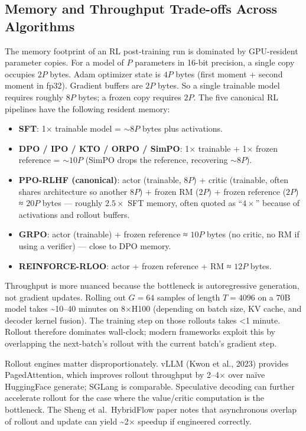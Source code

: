 \documentclass{article}
\begin{document}
\subsection{Memory and Throughput Trade-offs Across Algorithms}\label{memory-and-throughput-trade-offs-across-algorithms}

The memory footprint of an RL post-training run is dominated by GPU-resident parameter copies. For a model of \(P\) parameters in 16-bit precision, a single copy occupies \(2P\) bytes. Adam optimizer state is \(4P\) bytes (first moment + second moment in fp32). Gradient buffers are \(2P\) bytes. So a single trainable model requires roughly \(8P\) bytes; a frozen copy requires \(2P\). The five canonical RL pipelines have the following resident memory:

\begin{itemize}

\item
  \textbf{SFT}: 1× trainable model = \(\sim 8P\) bytes plus activations.
\item
  \textbf{DPO / IPO / KTO / ORPO / SimPO}: 1× trainable + 1× frozen reference = \(\sim 10P\) (SimPO drops the reference, recovering \(\sim 8P\)).
\item
  \textbf{PPO-RLHF (canonical)}: actor (trainable, \(8P\)) + critic (trainable, often shares architecture so another \(8P\)) + frozen RM (\(2P\)) + frozen reference (\(2P\)) ≈ \(20P\) bytes --- roughly \(2.5\times\) SFT memory, often quoted as ``\(4\times\)'' because of activations and rollout buffers.
\item
  \textbf{GRPO}: actor (trainable) + frozen reference ≈ \(10P\) bytes (no critic, no RM if using a verifier) --- close to DPO memory.
\item
  \textbf{REINFORCE-RLOO}: actor + frozen reference + RM ≈ \(12P\) bytes.
\end{itemize}

Throughput is more nuanced because the bottleneck is autoregressive generation, not gradient updates. Rolling out \(G = 64\) samples of length \(T = 4096\) on a 70B model takes \textasciitilde10--40 minutes on 8×H100 (depending on batch size, KV cache, and decoder kernel fusion). The training step on those rollouts takes \textless1 minute. Rollout therefore dominates wall-clock; modern frameworks exploit this by overlapping the next-batch's rollout with the current batch's gradient step.

Rollout engines matter disproportionately. vLLM (Kwon et al., 2023) provides PagedAttention, which improves rollout throughput by 2--4× over naïve HuggingFace generate; SGLang \citep{zheng20232023} is comparable. Speculative decoding can further accelerate rollout for the case where the value/critic computation is the bottleneck. The Sheng et al.~HybridFlow paper notes that asynchronous overlap of rollout and update can yield \textasciitilde2× speedup if engineered correctly.
\end{document}

